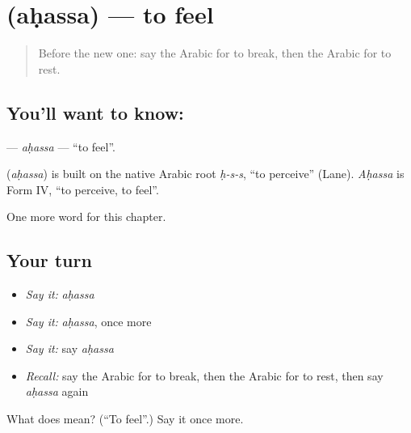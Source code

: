 \section[\texorpdfstring{\ar{أحس} (aḥassa)}{أحس (aḥassa)}]{ (aḥassa) — to feel}

\label{lesson:AR-C161-ahassa}



\begin{quote}
Before the new one: say the Arabic for to break, then the Arabic for to rest.
\end{quote}

\subsection*{You'll want to know: }
\textbf{} — \emph{aḥassa} — \textquotedblleft{}to feel\textquotedblright{}.

\begin{cousinweb}
\textbf{} (\emph{aḥassa}) is built on the native Arabic root \emph{ḥ-s-s}, \textquotedblleft{}to perceive\textquotedblright{} (Lane). \emph{Aḥassa} is Form IV, \textquotedblleft{}to perceive, to feel\textquotedblright{}.
\end{cousinweb}

\begin{grammarlens}[title={What you've built}]
One more word for this chapter.
\end{grammarlens}

\subsection*{Your turn}
\begin{itemize}
\raggedright
  \item \emph{Say it:} \emph{aḥassa}
  \item \emph{Say it:} \emph{aḥassa}, once more
  \item \emph{Say it:} say \emph{aḥassa}
  \item \emph{Recall:} say the Arabic for to break, then the Arabic for to rest, then say \emph{aḥassa} again
\end{itemize}

\begin{tcolorbox}[breakable,colback=teal!4,colframe=teal!35!black,title={Before you move on}]
What does  mean? (\textquotedblleft{}To feel\textquotedblright{}.) Say it once more.
\end{tcolorbox}
